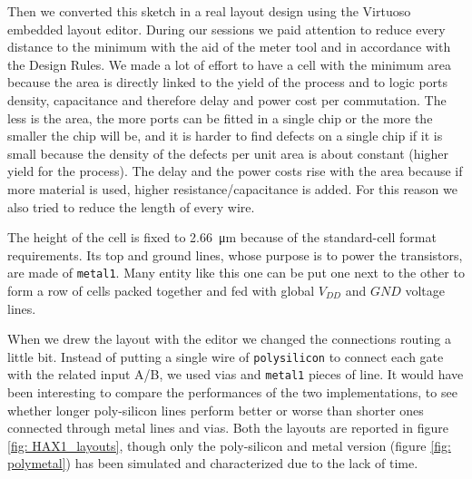 \documentclass[a4paper]{article}
\begin{document}
Then we converted this sketch in a real layout design using the Virtuoso embedded layout editor. During our sessions we paid attention to reduce every distance to the minimum with the aid of the meter tool and in accordance with the Design Rules. We made a lot of effort to have a cell with the minimum area because the area is directly linked to the yield of the process and to logic ports density, capacitance and therefore delay and power cost per commutation. The less is the area, the more ports can be fitted in a single chip or the more the smaller the chip will be, and it is harder to find defects on a single chip if it is small because the density of the defects per unit area is about constant (higher yield for the process). The delay and the power costs rise with the area because if more material is used, higher resistance/capacitance is added. For this reason we also tried to reduce the length of every wire.

The height of the cell is fixed to \SI{2.66}{\micro\meter} because of the standard-cell format requirements. Its top and ground lines, whose purpose is to power the transistors, are made of \texttt{metal1}. Many entity like this one can be put one next to the other to form a row of cells packed together and fed with global $V_{DD}$ and $GND$ voltage lines.

When we drew the layout with the editor we changed the connections routing a little bit. Instead of putting a single wire of \texttt{polysilicon} to connect each gate with the related input A/B, we used vias and \texttt{metal1} pieces of line. It would have been interesting to compare the performances of the two implementations, to see whether longer poly-silicon lines perform better or worse than shorter ones connected through metal lines and vias. Both the layouts are reported in figure \ref{fig: HAX1_layouts}, though only the poly-silicon and metal version (figure \ref{fig: polymetal}) has been simulated and characterized due to the lack of time.
\end{document}
